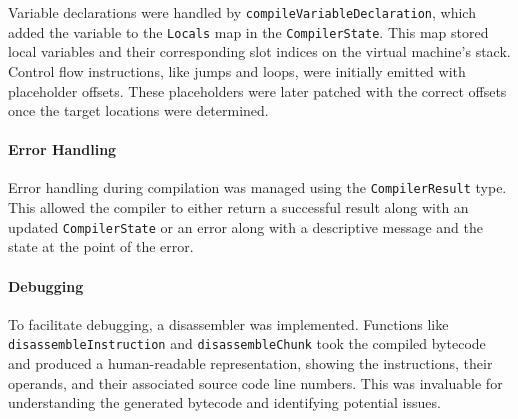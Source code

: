 Variable declarations were handled by \texttt{compileVariableDeclaration}, which added the variable to the \texttt{Locals} map in the \texttt{CompilerState}. 
This map stored local variables and their corresponding slot indices on the virtual machine's stack. 
Control flow instructions, like jumps and loops, were initially emitted with placeholder offsets. 
These placeholders were later patched with the correct offsets once the target locations were determined.

\paragraph{Error Handling}
Error handling during compilation was managed using the \texttt{CompilerResult} type. 
This allowed the compiler to either return a successful result along with an updated \texttt{CompilerState} or an error along with a descriptive message and the state at the point of the error.

\paragraph{Debugging}
To facilitate debugging, a disassembler was implemented. 
Functions like \texttt{disassembleInstruction} and \texttt{disassembleChunk} took the compiled bytecode and produced a human-readable representation, showing the instructions, their operands, and their associated source code line numbers. 
This was invaluable for understanding the generated bytecode and identifying potential issues.